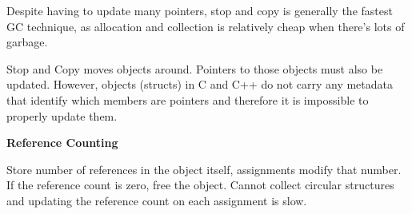 Despite having to update many pointers, stop and copy is generally the fastest GC technique, as allocation and collection is relatively cheap when there's lots of garbage. 


Stop and Copy moves objects around. Pointers to those objects must also be updated. However, objects (structs) in C and C++ do not carry any metadata that identify which members are pointers and therefore it is impossible to properly update them.\medskip

\textbf{Reference Counting }\smallskip
	
Store number of references in the object itself, assignments modify that number. If the reference count is zero, free the object. Cannot collect circular structures and updating the reference count on each assignment is slow.
